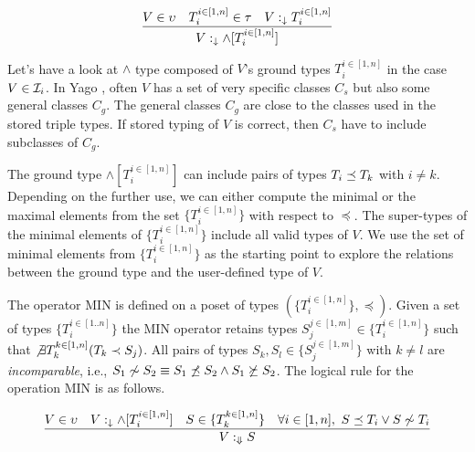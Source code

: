 \documentclass[runningheads]{llncs}
\newcommand{\darr}{\downarrow}
\newcommand{\Darr}{\Downarrow}
\newcommand{\I}{{\cal I}}
\newcommand{\memo}[1]{}
\begin{document}
\begin{equation}
\label{rul:land-1}
\dfrac{V\in\upsilon\quad\/T_i^{i\in[1,n]}\in\tau\quad\/V:_{\darr}T_i^{i\in[1,n]}}
      {V:_{\darr}\land[T_i^{i\in[1,n]}]}
\end{equation}

Let's have a look at $\land$ type composed of $V$'s ground types
$T_i^{i\in[1,n]}$ in the case $V\in\I_i$.  In Yago \cite{Hoffart2013}, often
$V$ has a set of very specific classes $C_s$ but also some general
classes $C_g$.  The general classes $C_g$ are close to the classes
used in the stored triple types.  If stored typing of $V$ is correct,
then $C_s$ have to include subclasses of $C_g$.

The ground type $\land[T_i^{i\in[1,n]}]$ can include pairs of types
$T_i\preceq\/T_k$ with $i\not=k$. Depending on the further use, we can
either compute the minimal or the maximal elements from the set
$\{T_i^{i\in[1,n]}\}$ with respect to $\preceq$. The super-types of the
minimal elements of $\{T_i^{i\in[1,n]}\}$ include all valid types of $V$. We
use the set of minimal elements from $\{T_i^{i\in[1,n]}\}$ as the starting
point to explore the relations between the ground type and the
user-defined type of $V$.

\memo{the type $\land[T_i^{i\in[1,n]}]$ It makes sense
either to compute MIN or MAX of $\land[T_i^{i\in[1,n]}]$ yielding
$\land[S_1..S_m]$ where $m\le\/n$ and
$S_j^{j\in[1,m]}\in\{T_i^{i\in[1,n]}\}$. The operator MIN computes
$S_j^{j\in[1,m]}$ such that each $S_j$ is minimal among
$T_i^{i\in[1,n]}$. The operator MAX computes $S_j^{j\in[1,m]}$ such
that each $S_j$ is maximal among $T_i^{i\in[1,n]}$. Note that in both
cases there are no pairs among $S_j^{j\in[1,m]}$ related by $\preceq$.}

The operator MIN is defined on a poset of types
$(\{T_i^{i\in[1,n]}\},\preceq)$. Given a set of types $\{T_i^{i\in[1..n]}\}$
the MIN operator retains types $S_j^{j\in[1,m]}\in\{T_i^{i\in[1,n]}\}$
such that $\not\exists\/T_k^{k\in[1,n]}(T_k\prec\/S_j)$. All pairs of
types $S_k,S_l\in\{S_j^{j\in[1,m]}\}$ with $k\not=l$ are
\emph{incomparable}, i.e.,
$S_1\not\sim\/S_2\equiv\/S_1\not\preceq\/S_2\land\/S_1\not\succeq\/S_2$.
The logical rule for the operation MIN is as follows.

\begin{equation}
\label{rul:min}
\dfrac{V\in\upsilon\quad\/V:_\darr\land[T_i^{i\in[1,n]}]\quad\/S\in\/\{T_k^{k\in[1,n]}\}\quad\forall\/i\in[1,n],\ S\preceq\/T_i\lor\/S\not\sim\/T_i}
      {V:_{\Darr}S}
\end{equation}
\end{document}
